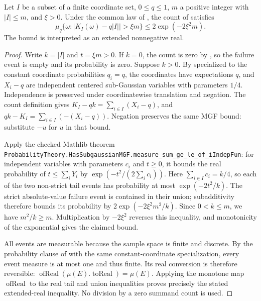 \begin{lemma}
Let $I$ be a subset of a finite coordinate set, $0\leq q\leq1$,
$m$ a positive integer with $|I|\leq m$, and $\xi>0$. Under the common
law of , the count of
 satisfies
\[
\mu_q\{\omega:|K_I(\omega)-q|I||>\xi m\}
\leq 2\exp(-2\xi^2 m).
\]
The bound is interpreted as an extended nonnegative real.
\end{lemma}
\begin{proof}
Write $k=|I|$ and $t=\xi m>0$. If $k=0$, the count is zero by
, so the failure event is empty and
its probability is zero. Suppose $k>0$. By
 specialized to the constant
coordinate probabilities $q_i=q$, the coordinates have expectations $q$,
and $X_i-q$ are independent centered
sub-Gaussian variables with parameters $1/4$. Independence is preserved
under coordinatewise translation and negation. The count definition gives
$K_I-qk=\sum_{i\in I}(X_i-q)$, and
$qk-K_I=\sum_{i\in I}(-(X_i-q))$. Negation preserves the same MGF bound:
substitute $-u$ for $u$ in that bound.

Apply the checked Mathlib theorem
\texttt{ProbabilityTheory.HasSubgaussianMGF.measure\_sum\_ge\_le\_of\_iIndepFun}:
for independent variables with parameters $c_i$ and $t\geq0$, it bounds
the real probability of $t\leq\sum_iY_i$ by
$\exp(-t^2/(2\sum_i c_i))$. Here $\sum_{i\in I}c_i=k/4$, so each of
the two non-strict tail events has probability at most
$\exp(-2t^2/k)$. The strict absolute-value failure event is contained
in their union; subadditivity therefore bounds its probability by
$2\exp(-2\xi^2m^2/k)$. Since $0<k\leq m$, we have $m^2/k\geq m$.
Multiplication by $-2\xi^2$ reverses this inequality, and monotonicity
of the exponential gives the claimed bound.

All events are measurable because the sample space is finite and
discrete. By the probability clause of
 with the same constant-coordinate specialization,
every event measure is at most one and thus finite. Its real conversion
is therefore reversible: $\operatorname{ofReal}(\mu(E).\operatorname{toReal})
=\mu(E)$. Applying the monotone map $\operatorname{ofReal}$ to the real
tail and union inequalities proves precisely the stated extended-real
inequality. No division by a zero summand count is used.
\end{proof}
